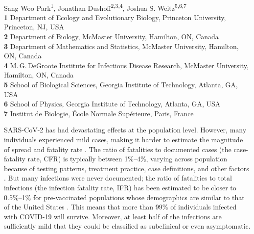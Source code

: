 \documentclass[12pt]{article}
\date{\today}
\begin{document}
\begin{flushleft}{
	\Large
	\textbf{}
}
\newline
\\
Sang Woo Park\textsuperscript{1},
Jonathan Dushoff\textsuperscript{2,3,4},
Joshua S. Weitz\textsuperscript{5,6,7}
\\
\bigskip
\textbf{1} Department of Ecology and Evolutionary Biology, Princeton University, Princeton, NJ, USA
\\
\textbf{2} Department of Biology, McMaster University, Hamilton, ON, Canada
\\
\textbf{3} Department of Mathematics and Statistics, McMaster University, Hamilton, ON, Canada
\\
\textbf{4} M.\,G.\,DeGroote Institute for Infectious Disease Research, McMaster University, Hamilton, ON, Canada
\\
\textbf{5} School of Biological Sciences, Georgia Institute of Technology, Atlanta, GA, USA
\\
\textbf{6} School of Physics, Georgia Institute of Technology, Atlanta, GA, USA
\\
\textbf{7} Institut de Biologie, \'{E}cole Normale Sup\'{e}rieure, Paris, France
\\
\bigskip

\bigskip
\end{flushleft}

SARS-CoV-2 has had devastating effects at the population level.
However, many individuals experienced mild cases, making it harder to estimate the magnitude of spread and fatality rate \citep{park2020time}. 
The ratio of fatalities to documented cases (the case-fatality rate, CFR) is typically between 1\%--4\%, varying across population because of testing patterns, treatment practice, case definitions, and other factors \citep{rajgor2020many,VERITY2020669,yang2020early}.
But many infections were never documented;
the ratio of fatalities to total infections (the infection fatality rate, IFR) has been estimated to be closer to 0.5\%--1\% for pre-vaccinated populations whose demographics are similar to that of the United States \citep{levin2020assessing}. 
This means that more than 99\% of individuals infected with COVID-19 will survive. 
Moreover, at least half of the infections are sufficiently mild that they could be classified as subclinical or even asymptomatic. 
\end{document}
